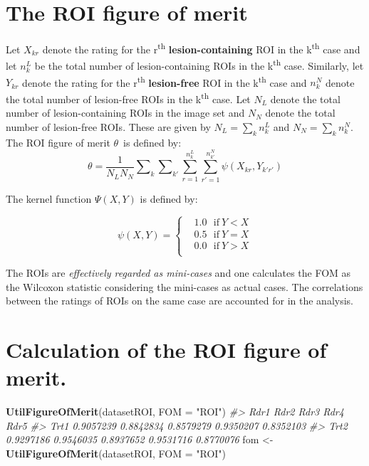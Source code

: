 \documentclass[]{book}
\newenvironment{Shaded}{\begin{snugshade}}{\end{snugshade}}
\newcommand{\CommentTok}[1]{\textcolor[rgb]{0.56,0.35,0.01}{\textit{#1}}}
\newcommand{\DataTypeTok}[1]{\textcolor[rgb]{0.13,0.29,0.53}{#1}}
\newcommand{\KeywordTok}[1]{\textcolor[rgb]{0.13,0.29,0.53}{\textbf{#1}}}
\newcommand{\NormalTok}[1]{#1}
\newcommand{\StringTok}[1]{\textcolor[rgb]{0.31,0.60,0.02}{#1}}
\begin{document}
\hypertarget{the-roi-figure-of-merit}{%
\section{The ROI figure of merit}\label{the-roi-figure-of-merit}}

Let \({X_{kr}}\) denote the rating for the r\textsuperscript{th} \textbf{lesion-containing} ROI in the k\textsuperscript{th} case and let \(n_{k}^L\) be the total number of lesion-containing ROIs in the k\textsuperscript{th} case. Similarly, let \({Y_{kr}}\) denote the rating for the r\textsuperscript{th} \textbf{lesion-free} ROI in the k\textsuperscript{th} case and \(n_{k}^N\) denote the total number of lesion-free ROIs in the k\textsuperscript{th} case. Let \({N_L}\) denote the total number of lesion-containing ROIs in the image set and \({N_N}\) denote the total number of lesion-free ROIs. These are given by \({N_L}=\sum\nolimits_{k}{n_{k}^L}\) and \({N_N}=\sum\nolimits_{k}{n_{k}^N}\). The ROI figure of merit \(\theta\)~is defined by: \[\theta =\frac{1}{{N_L}{N_N}}\sum\nolimits_{k}{\sum\nolimits_{{{k}'}}{\sum\limits_{r=1}^{n_{k}^L}{\sum\limits_{{r}'=1}^{n_{k'}^N}{\psi ({X_{kr}},{Y_{{k}'{r}'}})}}}}\]

The kernel function \(\Psi(X,Y)\) is defined by:

\[\psi (X,Y)=\left\{ \begin{aligned}
  & 1.0\ \ \ \text{if}\ Y<X \\ 
 & 0.5\ \ \ \text{if}\ Y=X \\ 
 & 0.0\ \ \ \text{if}\ Y>X \\ 
\end{aligned} \right.\]

The ROIs are \emph{effectively regarded as mini-cases} and one calculates the FOM as the Wilcoxon statistic considering the mini-cases as actual cases. The correlations between the ratings of ROIs on the same case are accounted for in the analysis.

\hypertarget{calculation-of-the-roi-figure-of-merit.}{%
\section{Calculation of the ROI figure of merit.}\label{calculation-of-the-roi-figure-of-merit.}}

\begin{Shaded}
\begin{Highlighting}[]
\KeywordTok{UtilFigureOfMerit}\NormalTok{(datasetROI, }\DataTypeTok{FOM =} \StringTok{"ROI"}\NormalTok{)}
\CommentTok{#>           Rdr1      Rdr2      Rdr3      Rdr4      Rdr5}
\CommentTok{#> Trt1 0.9057239 0.8842834 0.8579279 0.9350207 0.8352103}
\CommentTok{#> Trt2 0.9297186 0.9546035 0.8937652 0.9531716 0.8770076}
\NormalTok{fom <-}\StringTok{ }\KeywordTok{UtilFigureOfMerit}\NormalTok{(datasetROI, }\DataTypeTok{FOM =} \StringTok{"ROI"}\NormalTok{)}
\end{Highlighting}
\end{Shaded}
\end{document}
